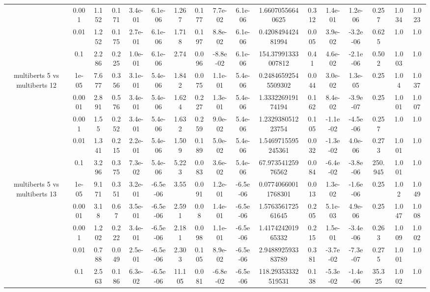 \begin{tabular}{|c|c|c|c|c|c|c|c|c|c|c|c|c|c|c|c|c|}
 & 0.001 & 1.152 & 0.171 & 3.4e-01 & 6.1e-06 & 1.267 & 0.177 & 7.7e-02 & 6.1e-06 & 1.66070556640625 & 0.312 & 1.4e-01 & 1.2e-06 & 0.257 & 1.034 & 1.023 \\
 & 0.01 & 1.252 & 0.175 & 2.7e-01 & 6.1e-06 & 1.718 & 0.197 & 8.8e-02 & 6.1e-06 & 0.420849442481994 & 0.005 & 3.9e-02 & -3.2e-06 & 0.625 & 1.0 & 1.0 \\
 & 0.1 & 2.286 & 0.225 & 1.0e-01 & 6.1e-06 & 2.74 & 0.096 & -8.8e-02 & 6.1e-06 & 154.37991333007812 & 0.41 & 4.6e-02 & -2.1e-06 & 0.502 & 1.003 & 1.0 \\
\hline
\multirow{5}{*}{multiberts 5 vs multiberts 12} & 1e-05 & 7.677 & 0.356 & 3.1e-01 & 5.4e-06 & 1.842 & 0.075 & 1.1e-01 & 5.4e-06 & 0.24846592545509302 & 0.044 & 3.0e-02 & 1.3e-05 & 0.25 & 1.04 & 1.037 \\
 & 0.0001 & 2.891 & 0.576 & 3.4e-01 & 5.4e-06 & 1.624 & 0.227 & 1.3e-01 & 5.4e-06 & 1.333226919174194 & 0.162 & 8.4e-02 & -3.9e-07 & 0.25 & 1.001 & 1.007 \\
 & 0.001 & 1.55 & 0.252 & 3.4e-01 & 5.4e-06 & 1.632 & 0.259 & 9.0e-02 & 5.4e-06 & 1.232938051223754 & 0.105 & -1.1e-02 & -4.5e-06 & 0.257 & 1.0 & 1.0 \\
 & 0.01 & 1.341 & 0.215 & 2.2e-01 & 5.4e-06 & 1.509 & 0.189 & 5.0e-02 & 5.4e-06 & 1.5469715595245361 & 0.032 & -1.3e-02 & 4.0e-06 & 0.273 & 1.001 & 1.0 \\
 & 0.1 & 3.296 & 0.375 & 7.3e-02 & 5.4e-06 & 5.223 & 0.083 & 3.6e-02 & 5.4e-06 & 67.97354125976562 & 0.084 & -6.4e-02 & -3.8e-06 & 250.945 & 1.001 & 1.0 \\
\hline
\multirow{5}{*}{multiberts 5 vs multiberts 13} & 1e-05 & 9.171 & 0.351 & 3.2e-01 & -6.5e-06 & 3.55 & 0.091 & 1.2e-01 & -6.5e-06 & 0.07740660011768301 & 0.013 & 1.3e-02 & -1.6e-06 & 0.25 & 1.02 & 1.049 \\
 & 0.0001 & 3.18 & 0.67 & 3.5e-01 & -6.5e-06 & 2.591 & 0.08 & 1.4e-01 & -6.5e-06 & 1.576356172561645 & 0.205 & 5.1e-03 & 4.9e-06 & 0.25 & 1.047 & 1.008 \\
 & 0.001 & 1.202 & 0.222 & 3.4e-01 & -6.5e-06 & 2.181 & 0.098 & 1.1e-01 & -6.5e-06 & 1.417424201965332 & 0.215 & 1.5e-01 & -3.4e-06 & 0.263 & 1.009 & 1.002 \\
 & 0.01 & 0.788 & 0.049 & 2.5e-01 & -6.5e-06 & 2.303 & 0.105 & 8.9e-02 & -6.5e-06 & 2.948892593383789 & 0.381 & -3.7e-02 & -7.3e-07 & 0.275 & 1.001 & 1.0 \\
 & 0.1 & 2.563 & 0.186 & 6.3e-02 & -6.5e-06 & 11.105 & 0.081 & -6.8e-02 & -6.5e-06 & 118.29353332519531 & 0.138 & -5.3e-02 & -1.4e-06 & 35.325 & 1.002 & 1.0 \\

\end{tabular}
